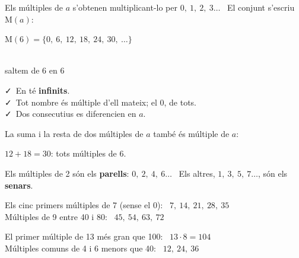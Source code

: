 \documentclass[11pt,a4paper]{article}
\newcommand{\comic}{\fontfamily{ComicNeue-TLF}\selectfont}
\begin{document}
\vfill
\begin{idea}[Múltiples]
Els múltiples de $a$ s'obtenen multiplicant-lo per $0,\ 1,\ 2,\ 3\ldots$ \ El conjunt s'escriu $\text{M}(a)$:\\[4pt]
{\centering\Large$\text{M}(6)=\{0,\ 6,\ 12,\ 18,\ 24,\ 30,\ \ldots\}$\par}
\end{idea}

\vfill
\begin{center}
\\
{\comic\small\color{fmmuted}saltem de 6 en 6}
\end{center}

\vfill
\begin{tcbraster}[raster columns=2,raster equal height,raster column skip=10pt]
\begin{tcolorbox}[fmbase,colback=fmK!8,colframe=fmK,coltitle=white,title={Propietats}]
\faCheck\ En té \textbf{infinits}.\\
\faCheck\ Tot nombre és múltiple d'ell mateix; el 0, de tots.\\
\faCheck\ Dos consecutius es diferencien en $a$.
\end{tcolorbox}
\begin{tcolorbox}[fmbase,colback=fmA!8,colframe=fmA,coltitle=white,title={Sumes i restes}]
La suma i la resta de dos múltiples de $a$ també és múltiple de $a$:\par\smallskip
$12+18=30$: tots múltiples de 6.
\end{tcolorbox}
\end{tcbraster}

\vfill
\begin{truc}
Els múltiples de 2 són els \textbf{parells}: $0,\ 2,\ 4,\ 6\ldots$ \ Els altres, $1,\ 3,\ 5,\ 7\ldots$, són els \textbf{senars}.
\end{truc}

\vfill
\begin{exemple}[Exemples]
\begin{minipage}[t]{0.48\linewidth}
Els cinc primers múltiples de 7 (sense el 0): \ $7,\ 14,\ 21,\ 28,\ 35$\\[4pt]
Múltiples de 9 entre 40 i 80: \ $45,\ 54,\ 63,\ 72$
\end{minipage}\hfill
\begin{minipage}[t]{0.49\linewidth}
El primer múltiple de 13 més gran que 100: \ $13\cdot8=\boxed{104}$\\[4pt]
Múltiples comuns de 4 i 6 menors que 40: \ $12,\ 24,\ 36$
\end{minipage}
\end{exemple}
\end{document}
